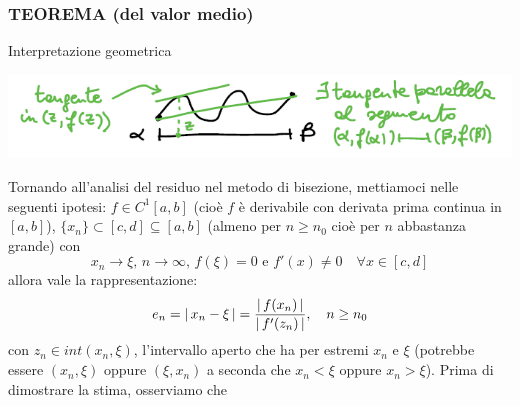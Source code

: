 \subsubsection{TEOREMA (del valor medio)}
\begin{center}
\end{center}
Interpretazione geometrica
\begin{center}
   \includegraphics{foto/pag25} 
\end{center}
Tornando all'analisi del residuo nel metodo di bisezione, mettiamoci nelle seguenti ipotesi: $f\in C^1[a,b]$ (cioè $f$ è derivabile con derivata prima continua in $[a,b]$), $\{x_n\}\subset[c,d]\subseteq[a,b]$ (almeno per $n\ge n_0$ cioè per $n$ abbastanza grande) con \[x_n \to \xi,\,n \to \infty,\,f(\xi)=0 \text{ e } f'(x)\ne 0\quad \forall x\in [c,d]\] allora vale la rappresentazione:
\[e_n = \lvert\,x_n-\xi\,\rvert = \frac{\lvert\,f(x_n)\,\rvert}{\lvert\,f'(z_n)\,\rvert},\quad n\ge n_0\] con $z_n\in int(x_n,\xi)$, l'intervallo aperto che ha per estremi $x_n$ e $\xi$ (potrebbe essere $(x_n,\xi)$ oppure $(\xi,x_n)$ a seconda che $x_n<\xi$ oppure $x_n>\xi$).
\newline \newline
Prima di dimostrare la stima, osserviamo che
